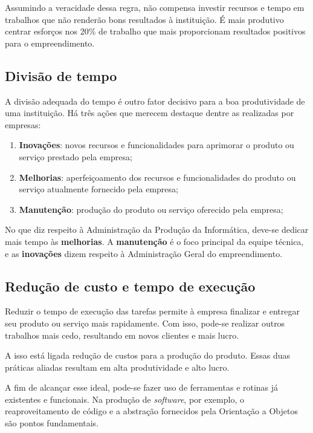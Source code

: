 \documentclass{article}
\begin{document}
Assumindo a veracidade dessa regra, não compensa investir recursos e tempo em
trabalhos que não renderão bons resultados à instituição. É mais produtivo
centrar esforços nos 20\% de trabalho que mais proporcionam resultados positivos
para o empreendimento.


\subsection{Divisão de tempo}

A divisão adequada do tempo é outro fator decisivo para a boa produtividade de
uma instituição. Há três ações que merecem destaque dentre as realizadas
por empresas:

\begin{enumerate}
	\item \textbf{Inovações}: novos recursos e funcionalidades para aprimorar o
	produto ou serviço prestado pela empresa;
	\item \textbf{Melhorias}: aperfeiçoamento dos recursos e funcionalidades do
	produto ou serviço atualmente fornecido pela empresa;
	\item \textbf{Manutenção}: produção do produto ou serviço oferecido pela empresa;
\end{enumerate}


No que diz respeito à Administração da Produção da Informática, deve-se dedicar
mais tempo às \textbf{melhorias}. A \textbf{manutenção} é o foco principal da
equipe técnica, e as \textbf{inovações} dizem respeito à Administração Geral do
empreendimento.


\subsection{Redução de custo e tempo de execução}

Reduzir o tempo de execução das tarefas permite à empresa finalizar e entregar
seu produto ou serviço mais rapidamente. Com isso, pode-se realizar outros
trabalhos mais cedo, resultando em novos clientes e mais lucro.

A isso está ligada  redução de custos para a produção do produto. Essas duas
práticas aliadas resultam em alta produtividade e alto lucro.

A fim de alcançar esse ideal, pode-se fazer uso de ferramentas e rotinas já
existentes e funcionais. Na produção de \textit{software}, por exemplo, o
reaproveitamento de código e a abstração fornecidos pela Orientação a Objetos
são pontos fundamentais.
\end{document}
